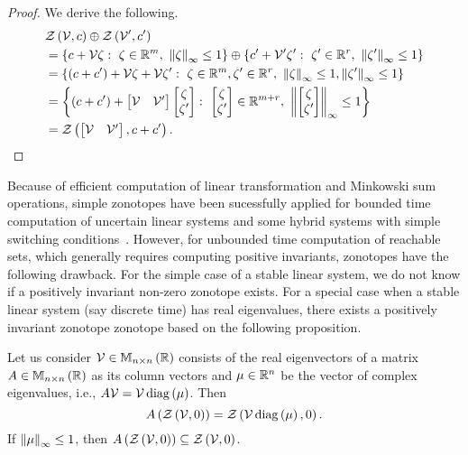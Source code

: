 \begin{proof}
We derive the following.
%
\begin{align*}
& \mathit{\mathcal{Z}}\left(\mathcal{V},c\right)\oplus\mathit{\mathcal{Z}}\left(\mathcal{V}^\prime,c^\prime\right)\\
& = \left\{c+\mathcal{V}\zeta:~\zeta\in\mathbb{R}^m,~\left\|\zeta\right\|_{\infty}\leq
    1\right\}\oplus\left\{c^\prime+\mathcal{V}^\prime\zeta^\prime:~\zeta^\prime\in\mathbb{R}^r,~\left\|\zeta^\prime\right\|_{\infty}\leq
    1\right\}\\
& =
  \left\{\left(c+c^\prime\right)+\mathcal{V}\zeta+\mathcal{V}\zeta^\prime:~\zeta\in\mathbb{R}^m,\zeta^\prime\in\mathbb{R}^r,~\left\|\zeta\right\|_{\infty}\leq
    1,\left\|\zeta^\prime\right\|_{\infty}\leq 1\right\}\\
& = \left\{\left(c+c^\prime\right)+\left[\begin{matrix}\mathcal{V}
      &\mathcal{V}^\prime\end{matrix}\right]\left[\begin{matrix}\zeta\\\zeta^\prime\end{matrix}\right]:~\left[\begin{matrix}\zeta\\\zeta^\prime\end{matrix}\right]\in\mathbb{R}^{m+r},~\left\|\left[\begin{matrix}\zeta\\\zeta^\prime\end{matrix}\right]\right\|_{\infty}\leq
    1\right\}\\
& =  \mathit{\mathcal{Z}}\left(\left[\begin{matrix}\mathcal{V} & \mathcal{V}^\prime\end{matrix}\right],c+c^\prime\right).\hspace{3em}\qedhere
\end{align*}
%
\end{proof}
%
Because of efficient computation of linear transformation and
Minkowski sum operations, simple zonotopes have been sucessfully
applied for bounded time computation of uncertain linear systems and
some hybrid systems with simple switching conditions~\cite{todo}.
However, for unbounded time computation of reachable sets, which
generally requires computing positive invariants, zonotopes have the
following drawback.  For the simple case of a stable linear system, we
do not know if a positively invariant non-zero zonotope exists.  For a
special case when a stable linear system (say discrete
time) has real eigenvalues, there exists a positively invariant
zonotope zonotope based on the following proposition.
%
\begin{proposition}
Let us consider $\mathcal{V}\in\mathbb{M}_{n\times n}\left(\mathbb{R}\right)$ consists
of the real eigenvectors of a matrix $A\in\mathbb{M}_{n\times n}\left(\mathbb{R}\right)$ as
its column vectors and $\mu\in\mathbb{R}^n$ be the vector of complex
eigenvalues, i.e., $A\mathcal{V}
= \mathcal{V}\operatorname{diag}\left(\mu\right)$.  Then \[A\left(\mathit{\mathcal{Z}}\left(\mathcal{V},0\right)\right)
= \mathit{\mathcal{Z}}\left(\mathcal{V}\operatorname{diag}\left(\mu\right),0\right).\] If
$\left\|\mu\right\|_{\infty}\leq 1$, then
$A\left(\mathit{\mathcal{Z}}\left(\mathcal{V},0\right)\right)\subseteq \mathit{\mathcal{Z}}\left(\mathcal{V},0\right)$.
\end{proposition}
% 
